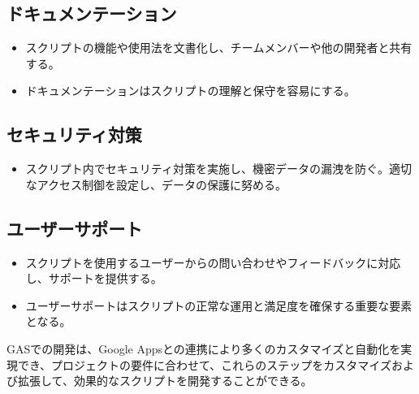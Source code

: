 \documentclass{jsarticle}
\begin{document}
\subsection{ドキュメンテーション}
\begin{itemize}
    \item スクリプトの機能や使用法を文書化し、チームメンバーや他の開発者と共有する。
    \item ドキュメンテーションはスクリプトの理解と保守を容易にする。
\end{itemize}

\subsection{セキュリティ対策}
\begin{itemize}
    \item スクリプト内でセキュリティ対策を実施し、機密データの漏洩を防ぐ。適切なアクセス制御を設定し、データの保護に努める。
\end{itemize}

\subsection{ユーザーサポート}
\begin{itemize}
    \item スクリプトを使用するユーザーからの問い合わせやフィードバックに対応し、サポートを提供する。
    \item ユーザーサポートはスクリプトの正常な運用と満足度を確保する重要な要素となる。
\end{itemize}

GASでの開発は、Google Appsとの連携により多くのカスタマイズと自動化を実現でき、プロジェクトの要件に合わせて、これらのステップをカスタマイズおよび拡張して、効果的なスクリプトを開発することができる。



























\newpage
\end{document}
